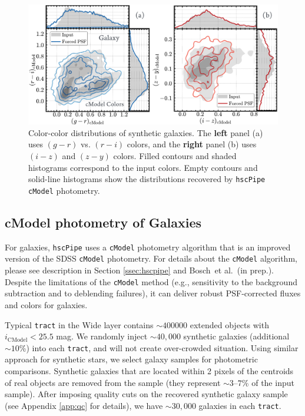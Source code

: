 \documentclass[useamsfonts]{pasj01}
\def\etal{{\ et al.~}}
\def\hscpipe{\texttt{hscPipe}}
\def\cmodel{\texttt{cModel}}
\def\tract{\texttt{tract}}
\begin{document}
\begin{figure}
    \begin{center}
        \includegraphics[width=\textwidth]{fig/synpipe_galaxy_cdist}
    \end{center}
    \caption{Color-color distributions of synthetic  galaxies.
        The \textbf{left} panel (a) uses $(g-r)$ vs. $(r-i)$ colors, and the 
        \textbf{right} panel (b) uses $(i-z)$ and $(z-y)$ colors. 
        Filled contours and shaded histograms correspond to the input colors. 
        Empty contours and solid-line histograms show the distributions recovered
        by \hscpipe{} \cmodel{} photometry.
        }
    \label{fig:cmodel_cdist}
\end{figure}

\subsection{cModel photometry of Galaxies}
    \label{ssec:cmodel}

    For galaxies, \hscpipe{} uses a \cmodel{} photometry algorithm that is an improved 
    version of the SDSS \cmodel{} photometry.
    For details about the \cmodel{} algorithm, please see description in Section 
    \ref{ssec:hscpipe} and Bosch\etal (in prep.).
    Despite the limitations of the \cmodel{} method (e.g., sensitivity to the 
    background subtraction and to deblending failures), it can deliver robust 
    PSF-corrected fluxes and colors for galaxies.

    Typical \tract{} in the Wide layer contains ${\sim}400000$ extended objects with 
    $i_{\mathrm{CModel}} < 25.5$ mag. 
    We randomly inject ${\sim}40,000$ synthetic galaxies (additional ${\sim}10$\%) 
    into each \tract{}, and will not create over-crowded situation.
    Using similar approach for synthetic stars, we select galaxy samples for 
    photometric comparisons. 
    Synthetic galaxies that are located within 2 pixels of the centroids of real 
    objects are removed from the sample (they represent ${\sim}3$--$7$\% of the 
    input sample). 
    After imposing quality cuts on the recovered synthetic galaxy sample 
    (see Appendix \ref{app:qc} for details), we have ${\sim}30,000$ galaxies in 
    each \tract{}.
    
\end{document}
